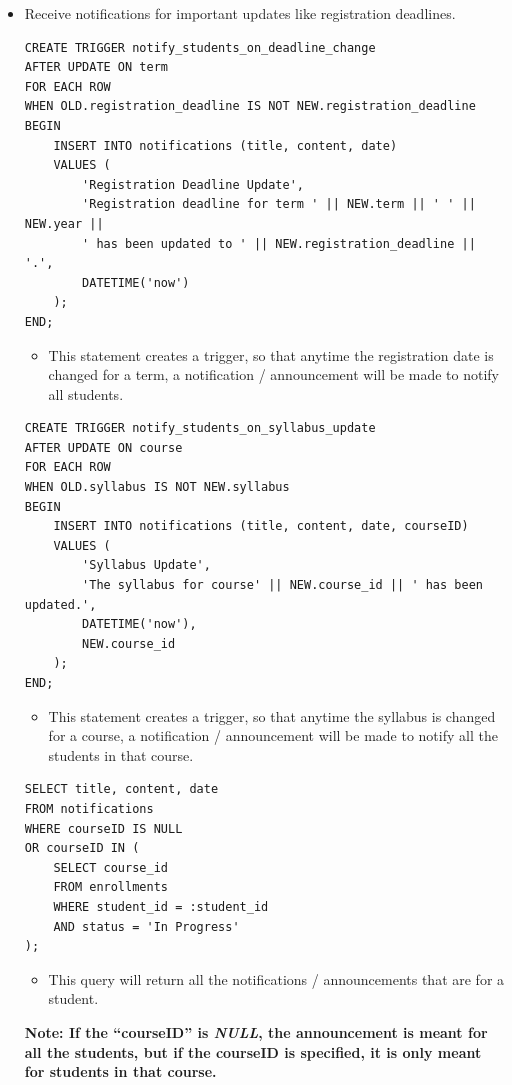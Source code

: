 \documentclass{report}
\begin{document}
\begin{itemize}
    \item Receive notifications for important updates like registration deadlines.
    \begin{lstlisting}
CREATE TRIGGER notify_students_on_deadline_change
AFTER UPDATE ON term
FOR EACH ROW
WHEN OLD.registration_deadline IS NOT NEW.registration_deadline
BEGIN
    INSERT INTO notifications (title, content, date) 
    VALUES (
        'Registration Deadline Update', 
        'Registration deadline for term ' || NEW.term || ' ' || NEW.year ||
        ' has been updated to ' || NEW.registration_deadline || '.',
        DATETIME('now')
    );
END;
    \end{lstlisting}
    \begin{itemize}
        \item This statement creates a trigger, so that anytime the registration date is changed for a term, a notification / announcement will be made to notify all students.
    \end{itemize}
    \begin{lstlisting}
CREATE TRIGGER notify_students_on_syllabus_update
AFTER UPDATE ON course
FOR EACH ROW
WHEN OLD.syllabus IS NOT NEW.syllabus
BEGIN
    INSERT INTO notifications (title, content, date, courseID) 
    VALUES (
        'Syllabus Update', 
        'The syllabus for course' || NEW.course_id || ' has been updated.',
        DATETIME('now'),
        NEW.course_id
    );
END;
    \end{lstlisting}
    \begin{itemize}
        \item This statement creates a trigger, so that anytime the syllabus is changed for a course, a notification / announcement will be made to notify all the students in that course.
    \end{itemize}
    \begin{lstlisting}
SELECT title, content, date
FROM notifications 
WHERE courseID IS NULL 
OR courseID IN (
    SELECT course_id 
    FROM enrollments 
    WHERE student_id = :student_id
    AND status = 'In Progress'
);
    \end{lstlisting}
    \begin{itemize}
        \item This query will return all the notifications / announcements that are for a student.
    \end{itemize}
\textbf{Note: If the ``courseID'' is \textit{NULL}, the announcement is meant for all the students, but if the courseID is specified, it is only meant for students in that course.}

\end{itemize}
\end{document}
